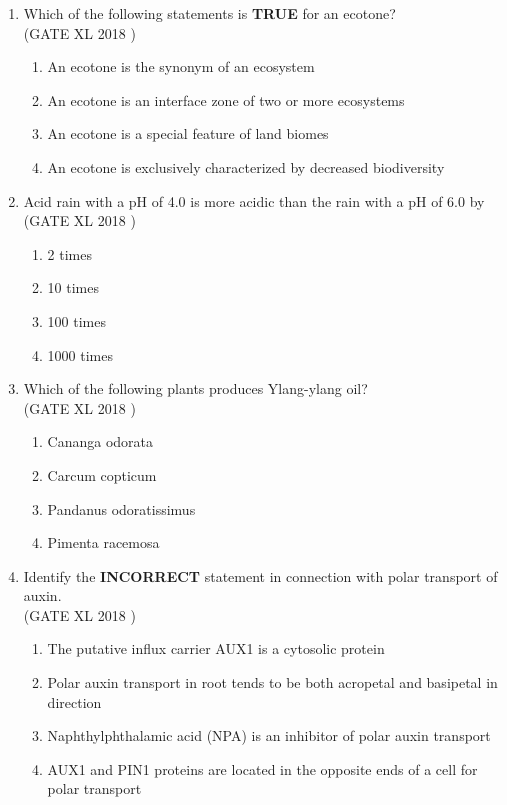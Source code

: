 \documentclass[14pt]{extarticle}
\begin{document}
\begin{flushleft}
\begin{enumerate}[leftmargin=*]
    \item Which of the following statements is \textbf{TRUE} for an ecotone?\\
   \hfill(GATE XL 2018 )
    \begin{enumerate}[label=(\Alph*)]
        \item An ecotone is the synonym of an ecosystem
        \item An ecotone is an interface zone of two or more ecosystems
        \item An ecotone is a special feature of land biomes
        \item An ecotone is exclusively characterized by decreased biodiversity
    \end{enumerate}
    

    \item Acid rain with a pH of 4.0 is more acidic than the rain with a pH of 6.0 by\\
    \hfill(GATE XL 2018 )
    \begin{multicols}{2}
    \begin{enumerate}[label=(\Alph*)]
        \item 2 times
        \item 10 times
        \item 100 times
        \item 1000 times
    \end{enumerate}
    \end{multicols}

    \item Which of the following plants produces Ylang-ylang oil?\\
    \hfill(GATE XL 2018 )
    \begin{multicols}{2}
    \begin{enumerate}[label=(\Alph*)]
        \item Cananga odorata
        \item Carcum copticum
        \item Pandanus odoratissimus
        \item Pimenta racemosa
    \end{enumerate}
    \end{multicols}

    \item Identify the \textbf{INCORRECT} statement in connection with polar transport of auxin.\\
    \hfill(GATE XL 2018 )
    \begin{enumerate}[label=(\Alph*)]
        \item The putative influx carrier AUX1 is a cytosolic protein
        \item Polar auxin transport in root tends to be both acropetal and basipetal in direction
        \item Naphthylphthalamic acid (NPA) is an inhibitor of polar auxin transport
        \item AUX1 and PIN1 proteins are located in the opposite ends of a cell for polar transport
    \end{enumerate}
     


\end{enumerate}
\end{flushleft}
\end{document}

